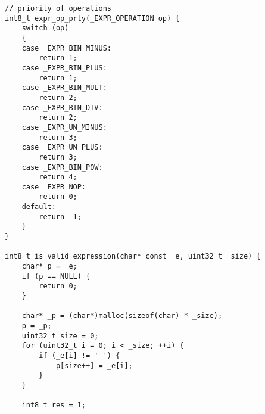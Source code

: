 \documentclass[a4paper]{article}
\newcounter{i}
\begin{document}
\begin{enumerate}[label=\textbf{\arabic*}.]
\begin{verbatim}
// priority of operations
int8_t expr_op_prty(_EXPR_OPERATION op) {
    switch (op)
    {
    case _EXPR_BIN_MINUS:
        return 1;
    case _EXPR_BIN_PLUS:
        return 1;
    case _EXPR_BIN_MULT:
        return 2;
    case _EXPR_BIN_DIV:
        return 2;
    case _EXPR_UN_MINUS:
        return 3;
    case _EXPR_UN_PLUS:
        return 3;
    case _EXPR_BIN_POW:
        return 4;    
    case _EXPR_NOP:
        return 0;
    default:
        return -1;
    }
}

int8_t is_valid_expression(char* const _e, uint32_t _size) {
    char* p = _e;
    if (p == NULL) {
        return 0;
    }

    char* _p = (char*)malloc(sizeof(char) * _size);
    p = _p;
    uint32_t size = 0;
    for (uint32_t i = 0; i < _size; ++i) {
        if (_e[i] != ' ') {
            p[size++] = _e[i];
        }
    }

    int8_t res = 1;


\end{verbatim}
\end{enumerate}
\end{document}
